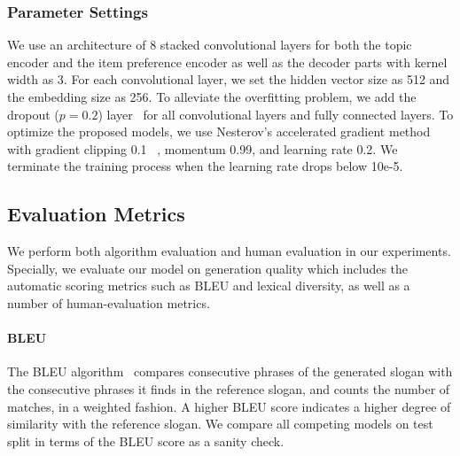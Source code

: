 \subsubsection{Parameter Settings}
We use an architecture of 8 stacked convolutional layers 
for both the topic encoder and the item preference encoder
as well as the decoder parts with kernel width as 3.
For each convolutional layer, we set the hidden vector size as 512
and the embedding size as 256.
To alleviate the overfitting problem, we add the dropout ($p=0.2$)
layer~\cite{srivastava2014dropout} for all convolutional layers and fully connected layers.
To optimize the proposed models,
we use Nesterov's accelerated gradient method
~\cite{sutskever2013importance} with gradient clipping 0.1
~\cite{pascanu2013difficulty},
momentum 0.99, and 
learning rate 0.2.
We terminate the training process when the learning rate drops 
below 10e-5.


\subsection{Evaluation Metrics}
\label{sec:metrics}
We perform both algorithm evaluation and human evaluation
in our experiments.
Specially, we evaluate our model on generation quality which includes
the automatic scoring metrics such as
BLEU and lexical diversity,
as well as a number of human-evaluation metrics.

\paragraph{BLEU}
The BLEU algorithm~\cite{papineni2002bleu} compares consecutive phrases of the 
generated slogan with the consecutive phrases it finds
in the reference slogan, and counts the number of matches, in a weighted fashion.
A higher BLEU score indicates a higher degree of similarity with the reference
slogan.
We compare all competing models on test split in terms of the BLEU score as a sanity check.

